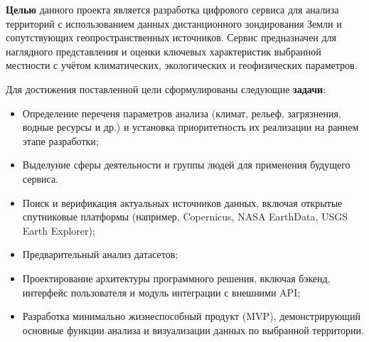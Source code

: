 \textbf{Целью} данного проекта является разработка цифрового сервиса для анализа территорий с использованием данных дистанционного зондирования Земли и сопутствующих геопространственных источников. Сервис предназначен для наглядного представления и оценки ключевых характеристик выбранной местности с учётом климатических, экологических и геофизических параметров.

Для достижения поставленной цели сформулированы следующие \textbf{задачи}:

\begin{itemize}
	\item Определение переченя параметров анализа (климат, рельеф, загрязнения, водные ресурсы и др.) и установка приоритетность их реализации на раннем этапе разработки;
	\item Выделуние сферы деятельности и группы людей для применения будущего сервиса.
	\item Поиск и верификация актуальных источников данных, включая открытые спутниковые платформы (например, Copernicus, NASA EarthData, USGS Earth Explorer);
	\item Предварительный анализ датасетов;
	\item Проектирование архитектуры программного решения, включая бэкенд, интерфейс пользователя и модуль интеграции с внешними API;
	\item Разработка минимально жизнеспособный продукт (MVP), демонстрирующий основные функции анализа и визуализации данных по выбранной территории.
\end{itemize}
